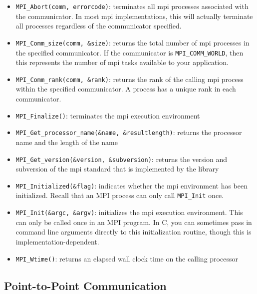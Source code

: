 \documentclass[10pt]{article}
\begin{document}
\begin{flushleft}
\begin{itemize}
\item {\tt MPI\_Abort(comm, errorcode)}: terminates all \gls{mpi} processes associated with the communicator. In most \gls{mpi} implementations, this will actually terminate all processes regardless of the communicator specified.
\item {\tt MPI\_Comm\_size(comm, \&size)}: returns the total number of \gls{mpi} processes in the specified communicator. If the communicator is {\tt MPI\_COMM\_WORLD}, then this represents the number of \gls{mpi} tasks available to your application.
\item {\tt MPI\_Comm\_rank(comm, \&rank)}: returns the rank of the calling \gls{mpi} process within the specified communicator. A process has a unique rank in each communicator.
\item {\tt MPI\_Finalize()}: terminates the \gls{mpi} execution environment
\item {\tt MPI\_Get\_processor\_name(\&name, \&resultlength)}: returns the processor name and the length of the name
\item {\tt MPI\_Get\_version(\&version, \&subversion)}: returns the version and subversion of the \gls{mpi} standard that is implemented by the library
\item {\tt MPI\_Initialized(\&flag)}: indicates whether the \gls{mpi} environment has been initialized. Recall that an MPI process can only call {\tt MPI\_Init} once.
\item {\tt MPI\_Init(\&argc, \&argv)}: initializes the \gls{mpi} execution environment. This can only be called once in an MPI program. In C, you can sometimes pass in command line arguments directly to this initialization routine, though this is implementation-dependent.
\item {\tt MPI\_Wtime()}: returns an elapsed wall clock time on the calling processor
\end{itemize}

\subsection{Point-to-Point Communication}


\end{flushleft}
\end{document}
